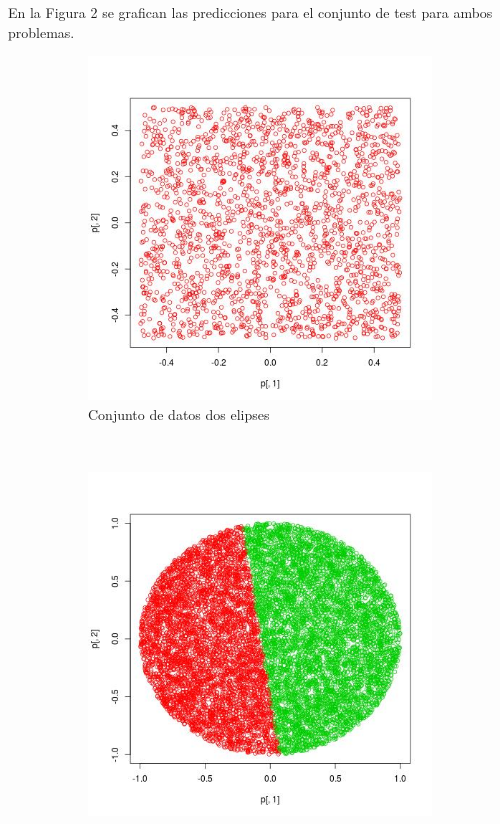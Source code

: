 \documentclass[12pt, a4paper]{article}
\begin{document}
\bigskip

En la Figura 2 se grafican las predicciones para el conjunto de test para ambos problemas.

\begin{figure}
    \centering

    \begin{subfigure}[b]{0.45\textwidth}
        \includegraphics[width=\textwidth]{doselipses1}
        \caption{Conjunto de datos dos elipses}
    \end{subfigure}
      ~ %
    \begin{subfigure}[b]{0.45\textwidth}
        \includegraphics[width=\textwidth]{espirales1}

\end{subfigure}
\end{figure}
\end{document}
